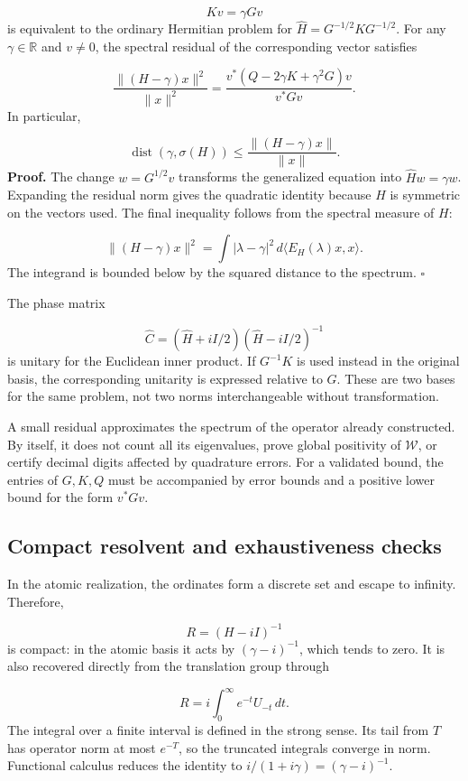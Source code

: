 \[
Kv=\gamma Gv
\]
is equivalent to the ordinary Hermitian problem for \(\widehat H=G^{-1/2}KG^{-1/2}\). For any \(\gamma\in\mathbb R\) and \(v\neq0\), the spectral residual of the corresponding vector satisfies

\[
\frac{\|(H-\gamma)x\|^2}{\|x\|^2}
=\frac{v^*(Q-2\gamma K+\gamma^2G)v}{v^*Gv}.
\]
In particular,

\[
\operatorname{dist}(\gamma,\sigma(H))
\leq\frac{\|(H-\gamma)x\|}{\|x\|}.
\]
\textbf{Proof.} The change \(w=G^{1/2}v\) transforms the generalized equation into \(\widehat Hw=\gamma w\). Expanding the residual norm gives the quadratic identity because \(H\) is symmetric on the vectors used. The final inequality follows from the spectral measure of \(H\):

\[
\|(H-\gamma)x\|^2
=\int |\lambda-\gamma|^2\,d\langle E_H(\lambda)x,x\rangle.
\]
The integrand is bounded below by the squared distance to the spectrum. \hfill\(\square\)

The phase matrix

\[
\widehat C=(\widehat H+iI/2)(\widehat H-iI/2)^{-1}
\]
is unitary for the Euclidean inner product. If \(G^{-1}K\) is used instead in the original basis, the corresponding unitarity is expressed relative to \(G\). These are two bases for the same problem, not two norms interchangeable without transformation.

A small residual approximates the spectrum of the operator already constructed. By itself, it does not count all its eigenvalues, prove global positivity of \(\mathscr W\), or certify decimal digits affected by quadrature errors. For a validated bound, the entries of \(G,K,Q\) must be accompanied by error bounds and a positive lower bound for the form \(v^*Gv\).

\subsection{Compact resolvent and exhaustiveness checks}
\label{viii:rz:resolvente}
In the atomic realization, the ordinates form a discrete set and escape to infinity. Therefore,

\[
R=(H-iI)^{-1}
\]
is compact: in the atomic basis it acts by \((\gamma-i)^{-1}\), which tends to zero. It is also recovered directly from the translation group through

\[
R=i\int_0^\infty e^{-t}U_{-t}\,dt.
\]
The integral over a finite interval is defined in the strong sense. Its tail from \(T\) has operator norm at most \(e^{-T}\), so the truncated integrals converge in norm. Functional calculus reduces the identity to \(i/(1+i\gamma)=(\gamma-i)^{-1}\).

